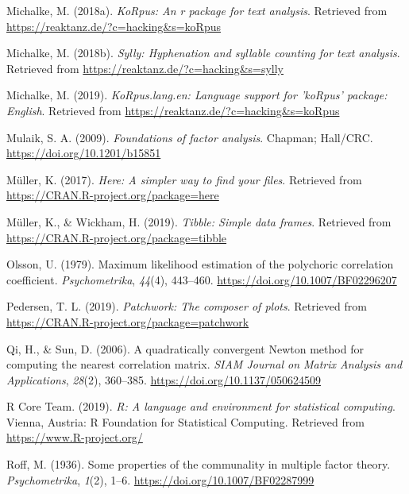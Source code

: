 \documentclass[
  english,
  man]{apa6}
\begin{document}
\leavevmode\hypertarget{ref-R-koRpus}{}%
Michalke, M. (2018a). \emph{KoRpus: An r package for text analysis}. Retrieved from \url{https://reaktanz.de/?c=hacking\&s=koRpus}

\leavevmode\hypertarget{ref-R-sylly}{}%
Michalke, M. (2018b). \emph{Sylly: Hyphenation and syllable counting for text analysis}. Retrieved from \url{https://reaktanz.de/?c=hacking\&s=sylly}

\leavevmode\hypertarget{ref-R-koRpus.lang.en}{}%
Michalke, M. (2019). \emph{KoRpus.lang.en: Language support for 'koRpus' package: English}. Retrieved from \url{https://reaktanz.de/?c=hacking\&s=koRpus}

\leavevmode\hypertarget{ref-mulaik2009foundations}{}%
Mulaik, S. A. (2009). \emph{Foundations of factor analysis}. Chapman; Hall/CRC. \url{https://doi.org/10.1201/b15851}

\leavevmode\hypertarget{ref-R-here}{}%
Müller, K. (2017). \emph{Here: A simpler way to find your files}. Retrieved from \url{https://CRAN.R-project.org/package=here}

\leavevmode\hypertarget{ref-R-tibble}{}%
Müller, K., \& Wickham, H. (2019). \emph{Tibble: Simple data frames}. Retrieved from \url{https://CRAN.R-project.org/package=tibble}

\leavevmode\hypertarget{ref-olsson1979maximum}{}%
Olsson, U. (1979). Maximum likelihood estimation of the polychoric correlation coefficient. \emph{Psychometrika}, \emph{44}(4), 443--460. \url{https://doi.org/10.1007/BF02296207}

\leavevmode\hypertarget{ref-R-patchwork}{}%
Pedersen, T. L. (2019). \emph{Patchwork: The composer of plots}. Retrieved from \url{https://CRAN.R-project.org/package=patchwork}

\leavevmode\hypertarget{ref-qi2006}{}%
Qi, H., \& Sun, D. (2006). A quadratically convergent Newton method for computing the nearest correlation matrix. \emph{SIAM Journal on Matrix Analysis and Applications}, \emph{28}(2), 360--385. \url{https://doi.org/10.1137/050624509}

\leavevmode\hypertarget{ref-R-base}{}%
R Core Team. (2019). \emph{R: A language and environment for statistical computing}. Vienna, Austria: R Foundation for Statistical Computing. Retrieved from \url{https://www.R-project.org/}

\leavevmode\hypertarget{ref-roff1936some}{}%
Roff, M. (1936). Some properties of the communality in multiple factor theory. \emph{Psychometrika}, \emph{1}(2), 1--6. \url{https://doi.org/10.1007/BF02287999}
\end{document}
